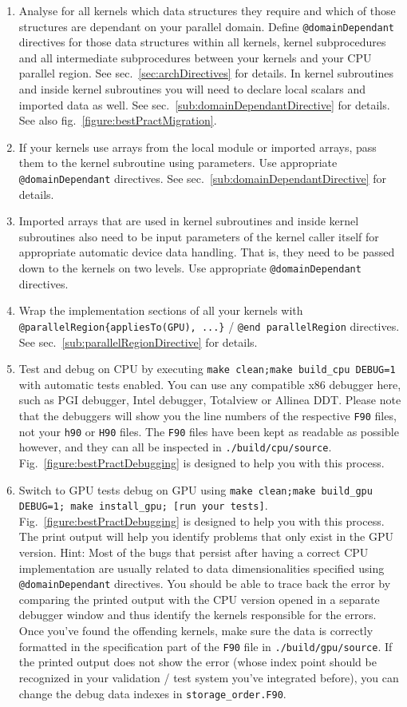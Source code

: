 {\begin{enumerate}
 \item Analyse for all kernels which data structures they require and which of those structures are dependant on your parallel domain. Define \verb|@domainDependant| directives for those data structures within all kernels, kernel subprocedures and all intermediate subprocedures between your kernels and your CPU parallel region. See sec.~\ref{sec:archDirectives} for details. In kernel subroutines and inside kernel subroutines you will need to declare local scalars and imported data as well. See sec.~\ref{sub:domainDependantDirective} for details. See also fig.~\ref{figure:bestPractMigration}.
 \item If your kernels use arrays from the local module or imported arrays, pass them to the kernel subroutine using parameters. Use appropriate \verb|@domainDependant| directives. See sec.~\ref{sub:domainDependantDirective} for details.
 \item Imported arrays that are used in kernel subroutines and inside kernel subroutines also need to be input parameters of the kernel caller itself for appropriate automatic device data handling. That is, they need to be passed down to the kernels on two levels. Use appropriate \verb|@domainDependant| directives.
 \item Wrap the implementation sections of all your kernels with \linebreak\verb|@parallelRegion{appliesTo(GPU), ...}| / \verb|@end parallelRegion| directives. See sec.~\ref{sub:parallelRegionDirective} for details.
 \item Test and debug on CPU by executing \linebreak\verb|make clean;make build_cpu DEBUG=1| with automatic tests enabled. You can use any compatible x86 debugger here, such as PGI debugger, Intel debugger, Totalview or Allinea DDT. Please note that the debuggers will show you the line numbers of the respective \verb|F90| files, not your \verb|h90| or \verb|H90| files. The \verb|F90| files have been kept as readable as possible however, and they can all be inspected in \verb|./build/cpu/source|. Fig.~\ref{figure:bestPractDebugging} is designed to help you with this process.
 \item Switch to GPU tests debug on GPU using \linebreak\verb|make clean;make build_gpu DEBUG=1; make install_gpu; [run your tests]|. Fig.~\ref{figure:bestPractDebugging} is designed to help you with this process. The print output will help you identify problems that only exist in the GPU version. Hint: Most of the bugs that persist after having a correct CPU implementation are usually related to data dimensionalities specified using \verb|@domainDependant| directives. You should be able to trace back the error by comparing the printed output with the CPU version opened in a separate debugger window and thus identify the kernels responsible for the errors. Once you've found the offending kernels, make sure the data is correctly formatted in the specification part of the \verb|F90| file in \verb|./build/gpu/source|. If the printed output does not show the error (whose index point should be recognized in your validation / test system you've integrated before), you can change the debug data indexes in \verb|storage_order.F90|.

\end{enumerate}}
